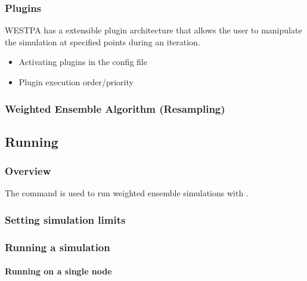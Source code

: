 \documentclass[letterpaper,10pt,english]{sphinxmanual}
\begin{document}
\subsubsection{Plugins}
\label{\detokenize{users_guide/west/setup:plugins}}
WESTPA has a extensible plugin architecture that allows the user to manipulate
the simulation at specified points during an iteration.
\begin{itemize}
\item {} 
Activating plugins in the config file

\item {} 
Plugin execution order/priority

\end{itemize}


\subsubsection{Weighted Ensemble Algorithm (Resampling)}
\label{\detokenize{users_guide/west/setup:weighted-ensemble-algorithm-resampling}}

\subsection{Running}
\label{\detokenize{users_guide/west/running:running}}\label{\detokenize{users_guide/west/running:id1}}\label{\detokenize{users_guide/west/running::doc}}

\subsubsection{Overview}
\label{\detokenize{users_guide/west/running:overview}}
The  command is used to run weighted ensemble simulations
 with .


\subsubsection{Setting simulation limits}
\label{\detokenize{users_guide/west/running:setting-simulation-limits}}

\subsubsection{Running a simulation}
\label{\detokenize{users_guide/west/running:running-a-simulation}}

\paragraph{Running on a single node}
\label{\detokenize{users_guide/west/running:running-on-a-single-node}}
\end{document}

